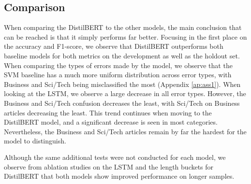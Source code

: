 \documentclass[12pt,a4paper,english]{article}
\begin{document}
\subsection{Comparison}
When comparing the DistilBERT to the other models, the main conclusion that can be reached is that it simply performs far better. Focusing in the first place on the accuracy and F1-score, we observe that DistilBERT outperforms both baseline models for both metrics on the development as well as the holdout set. When comparing the types of errors made by the model, we observe that the SVM baseline has a much more uniform distribution across error types, with Business and Sci/Tech being misclassified the most (Appendix \ref{ap:ass1}). When looking at the LSTM, we observe a large decrease in all error types. However, the Business and Sci/Tech confusion decreases the least, with Sci/Tech on Business articles decreasing the least. This trend continues when moving to the DistilBERT model, and a significant decrease is seen in most categories. Nevertheless, the Business and Sci/Tech articles remain by far the hardest for the model to distinguish. 

Although the same additional tests were not conducted for each model, we observe from ablation studies on the LSTM and the length buckets for DistilBERT that both models show improved performance on longer samples. 
\end{document}
